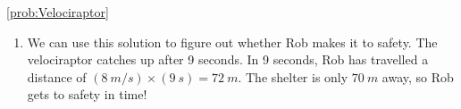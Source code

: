 \begin{solution}{\ref{prob:Velociraptor}}
\begin{enumerate}[label=(\alph*)]
Since $v_{0V}=0$ (the velociraptor starts running from rest) and $x_{0V}=0$, we can write our equations as:
\begin{align*}
x_R&=x_{0R}+v_{R}t\\
x_V&=\frac{1}{2}a_Vt^2
\end{align*}
 

Remember that we want to find $t$ when $x_R$=$x_V$. Setting the above equations equal to one another gives:
\begin{align*}
x_{0R}+v_{R}t&=\frac{1}{2}a_Vt^2 
\end{align*}
that we can rearrange to get the quadratic:
\begin{align*}
0&=\frac{1}{2}a_Vt^2-v_{R}t-x_{0R} 
\end{align*}

Solving the quadratic gives $t=\SI{6}{s}$. This doesn't quite give us the answer we want. We want to know how long it takes the velociraptor to catch up \textit{from the moment Rob passes by}, so we have to add on the $\SI{3}{s}$ reaction time, giving a total time of $\SI{9}{s}$.\\

\item We can use this solution to figure out whether Rob makes it to safety. The velociraptor catches up after 9 seconds. In 9 seconds, Rob has travelled a distance of $(\SI{8}{m/s})\times (\SI{9}{s}) = \SI{72}{m}$. The shelter is only $\SI{70}{m}$ away, so Rob gets to safety in time!
\end{enumerate}
\end{solution}


